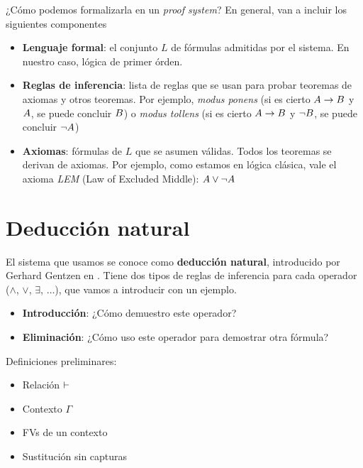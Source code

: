 ¿Cómo podemos formalizarla en un \textit{proof system}? En general, van a
incluir los siguientes componentes

\begin{itemize}
    \item \textbf{Lenguaje formal}: el conjunto $L$ de fórmulas admitidas por
    el sistema. En nuestro caso, lógica de primer órden.
    \item \textbf{Reglas de inferencia}: lista de reglas que se usan para probar
    teoremas de axiomas y otros teoremas. Por ejemplo, \textit{modus ponens} (si
    es cierto $A \rightarrow B$ y $A$, se puede concluir $B$) o
    \textit{modus tollens} (si es cierto $A \rightarrow B$ y $\neg
    B$, se puede concluir $\neg A$)
    \item \textbf{Axiomas}: fórmulas de $L$ que se asumen válidas. Todos los
    teoremas se derivan de axiomas. Por ejemplo, como estamos en lógica clásica,
    vale el axioma \textit{LEM} (Law of Excluded Middle): $A \vee \neg A$
\end{itemize}

\section{Deducción natural}

El sistema que usamos se conoce como \textbf{deducción natural}, introducido por
Gerhard Gentzen en \cite{gentzen-1935} . Tiene dos tipos de
reglas de inferencia para cada operador ($\wedge$, $\vee$, $\exists$, $\dots$),
que vamos a introducir con un ejemplo.

\begin{itemize}
    \item \textbf{Introducción}: ¿Cómo demuestro este operador?
    \item \textbf{Eliminación}: ¿Cómo uso este operador para demostrar otra fórmula?
\end{itemize}

Definiciones preliminares:

\begin{itemize}
    \item Relación $\vdash$
    \item Contexto $\Gamma$
    \item FVs de un contexto
    \item Sustitución sin capturas
\end{itemize}


